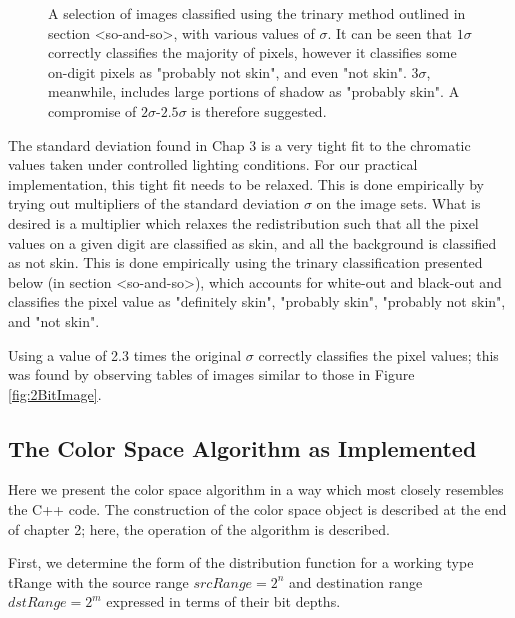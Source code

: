 {\begin{figure}[h!]
      \caption{A selection of images classified using the trinary method outlined in section <so-and-so>, with various values of $\sigma$. It can be seen that $1\sigma$ correctly classifies the majority of pixels, however it classifies some on-digit pixels as "probably not skin", and even "not skin". $3\sigma$, meanwhile, includes large portions of shadow as "probably skin". A compromise of $2\sigma$-$2.5\sigma$ is therefore suggested.} \label{fig:RelaxedSigma}
  \end{figure}
  \clearpage
  }
  
  The standard deviation found in Chap 3 is a very tight fit to the chromatic values taken under controlled lighting conditions. For our practical implementation, this tight fit needs to be relaxed. This is done empirically by trying out multipliers of the standard deviation $\sigma$ on the image sets. What is desired is a multiplier which relaxes the redistribution such that all the pixel values on a given digit are classified as skin, and all the background is classified as not skin. This is done empirically using the trinary classification presented below (in section <so-and-so>), which accounts for white-out and black-out and classifies the pixel value as "definitely skin", "probably skin", "probably not skin", and "not skin".
  
  Using a value of 2.3 times the original $\sigma$ correctly classifies the pixel values; this was found by observing tables of images similar to those in Figure \ref{fig:2BitImage}. 
  
  
  \subsection{The Color Space Algorithm as Implemented}\label{sec:ColorSpaceAlgorithmAsImplemented}
  Here we present the color space algorithm in a way which most closely resembles the C++ code. The construction of the color space object is described at the end of chapter 2; here, the operation of the algorithm is described.
  
  First, we determine the form of the distribution function for a working type tRange with the source range $srcRange=2^n$  and destination range $dstRange=2^m$ expressed in terms of their bit depths.
  
